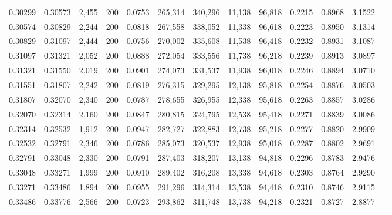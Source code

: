 \begin{tabular}{rrrrrrrrrrrrr}
0.30299 & 0.30573 &  2,455 & 200 &                                     0.0753 & 265,314 & 340,296 &  11,138 &  96,818 & 0.2215 & 0.8968 & 3.1522 \\
0.30574 & 0.30829 &  2,244 & 200 &                                     0.0818 & 267,558 & 338,052 &  11,338 &  96,618 & 0.2223 & 0.8950 & 3.1314 \\
0.30829 & 0.31097 &  2,444 & 200 &                                     0.0756 & 270,002 & 335,608 &  11,538 &  96,418 & 0.2232 & 0.8931 & 3.1087 \\
0.31097 & 0.31321 &  2,052 & 200 &                                     0.0888 & 272,054 & 333,556 &  11,738 &  96,218 & 0.2239 & 0.8913 & 3.0897 \\
0.31321 & 0.31550 &  2,019 & 200 &                                     0.0901 & 274,073 & 331,537 &  11,938 &  96,018 & 0.2246 & 0.8894 & 3.0710 \\
0.31551 & 0.31807 &  2,242 & 200 &                                     0.0819 & 276,315 & 329,295 &  12,138 &  95,818 & 0.2254 & 0.8876 & 3.0503 \\
0.31807 & 0.32070 &  2,340 & 200 &                                     0.0787 & 278,655 & 326,955 &  12,338 &  95,618 & 0.2263 & 0.8857 & 3.0286 \\
0.32070 & 0.32314 &  2,160 & 200 &                                     0.0847 & 280,815 & 324,795 &  12,538 &  95,418 & 0.2271 & 0.8839 & 3.0086 \\
0.32314 & 0.32532 &  1,912 & 200 &                                     0.0947 & 282,727 & 322,883 &  12,738 &  95,218 & 0.2277 & 0.8820 & 2.9909 \\
0.32532 & 0.32791 &  2,346 & 200 &                                     0.0786 & 285,073 & 320,537 &  12,938 &  95,018 & 0.2287 & 0.8802 & 2.9691 \\
0.32791 & 0.33048 &  2,330 & 200 &                                     0.0791 & 287,403 & 318,207 &  13,138 &  94,818 & 0.2296 & 0.8783 & 2.9476 \\
0.33048 & 0.33271 &  1,999 & 200 &                                     0.0910 & 289,402 & 316,208 &  13,338 &  94,618 & 0.2303 & 0.8764 & 2.9290 \\
0.33271 & 0.33486 &  1,894 & 200 &                                     0.0955 & 291,296 & 314,314 &  13,538 &  94,418 & 0.2310 & 0.8746 & 2.9115 \\
0.33486 & 0.33776 &  2,566 & 200 &                                     0.0723 & 293,862 & 311,748 &  13,738 &  94,218 & 0.2321 & 0.8727 & 2.8877 \\

\end{tabular}
